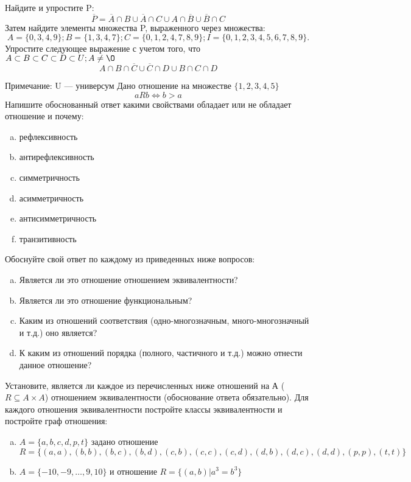 \documentclass[10pt]{exam}
\begin{document}
\begin{questions}
\question
Найдите и упростите P:
\begin{equation*}
\overline{P} = \overline{A} \cap B \cup \overline{A} \cap C \cup A \cap \overline{B} \cup \overline{B} \cap C
\end{equation*}
Затем найдите элементы множества P, выраженного через множества:
\begin{equation*}
A = \{0, 3, 4, 9\}; 
B = \{1, 3, 4, 7\};
C = \{0, 1, 2, 4, 7, 8, 9\};
I = \{0, 1, 2, 3, 4, 5, 6, 7, 8, 9\}.
\end{equation*}\question
Упростите следующее выражение с учетом того, что $A\subset B \subset C \subset D \subset U; A \neq \O$
\begin{equation*}
A \cap B  \cap \overline{C} \cup \overline{C} \cap D \cup B \cap C \cap D
\end{equation*}

Примечание: U — универсум\question
Дано отношение на множестве $\{1, 2, 3, 4, 5\}$ 
\begin{equation*}
aRb \iff b > a
\end{equation*}
Напишите обоснованный ответ какими свойствами обладает или не обладает отношение и почему:   
\begin{enumerate} [a)]\setcounter{enumi}{0}
\item рефлексивность
\item антирефлексивность
\item симметричность
\item асимметричность
\item антисимметричность
\item транзитивность
\end{enumerate}

Обоснуйте свой ответ по каждому из приведенных ниже вопросов:
\begin{enumerate} [a)]\setcounter{enumi}{0}
    \item Является ли это отношение отношением эквивалентности?
    \item Является ли это отношение функциональным?
    \item Каким из отношений соответствия (одно-многозначным, много-многозначный и т.д.) оно является?
    \item К каким из отношений порядка (полного, частичного и т.д.) можно отнести данное отношение?
\end{enumerate}

\question
Установите, является ли каждое из перечисленных ниже отношений на А ($R \subseteq A \times A$) отношением эквивалентности (обоснование ответа обязательно). Для каждого отношения эквивалентности постройте классы 
эквивалентности и постройте граф отношения:
\begin{enumerate} [a)]\setcounter{enumi}{0}
\item $A = \{a, b, c, d, p, t\}$ задано отношение $R = \{(a, a), (b, b), (b, c), (b, d), (c, b), (c, c), (c, d), (d, b), (d, c), (d, d), (p,p), (t,t)\}$
\item $A = \{-10, -9, … , 9, 10\}$ и отношение $R = \{(a,b)|a^{3} = b^{3}\}$


\end{enumerate}
\end{questions}
\end{document}
